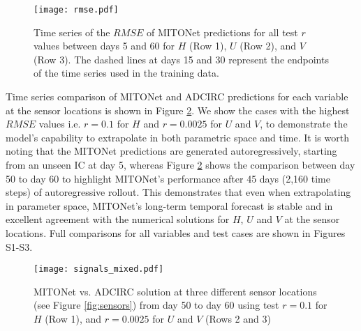 \documentclass[draft]{agujournal2019}
\begin{document}
\begin{figure}[h]
    \centering
    \texttt{[image: rmse.pdf]}
    \caption{Time series of the $RMSE$ of MITONet predictions for all test $r$ values between days 5 and 60 for $H$ (Row 1), $U$ (Row 2), and $V$ (Row 3). The dashed lines at days 15 and 30 represent the endpoints of the time series used in the training data.}
    \label{fig:rmse}
\end{figure}

Time series comparison of MITONet and ADCIRC predictions for each variable at the sensor locations is shown in Figure \ref{fig:signals_mixed}. We show the cases with the highest $RMSE$ values i.e. $r=0.1$ for $H$ and $r=0.0025$ for $U$ and $V$, to demonstrate the model's capability to extrapolate in both parametric space and time. It is worth noting that the MITONet predictions are generated autoregressively, starting from an unseen IC at day 5, whereas Figure \ref{fig:signals_mixed} shows the comparison between day 50 to day 60 to highlight MITONet's performance after 45 days (2,160 time steps) of autoregressive rollout. This demonstrates that even when extrapolating in parameter space, MITONet's long-term temporal forecast is stable and in excellent agreement with the numerical solutions for $H$, $U$ and $V$ at the sensor locations. Full comparisons for all variables and test cases are shown in Figures S1-S3.

\begin{figure}[h]
    \centering
    \texttt{[image: signals\_mixed.pdf]}
    \caption{MITONet vs. ADCIRC solution at three different sensor locations (see Figure \ref{fig:sensors}) from day 50 to day 60 using test $r=0.1$ for $H$ (Row 1), and $r=0.0025$ for $U$ and $V$ (Rows 2 and 3)}
    \label{fig:signals_mixed}
\end{figure}
\end{document}
